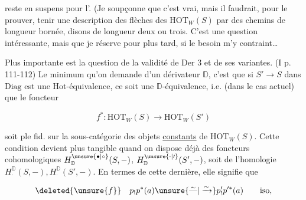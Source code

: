 
reste en suspens pour l'. (Je soupçonne que c'est vrai, mais il faudrait, pour le prouver, tenir une description des flèches des $\mathrm{HOT}_W(S)$ par des chemins de longueur bornée, disons  de longueur deux ou trois. C'est une question intéressante, mais que je réserve pour plus tard, si le besoin m'y contraint\ldots

Plus importante est la question de la validité de Der 3 et de ses variantes. (I p. 111-112) Le minimum qu'on demande d'un dérivateur $\mathbb D$, c'est que si $S'\longrightarrow S$ dans $\mathrm{Diag}$ est une Hot-équivalence, ce soit une $\mathbb D$-équivalence, i.e.  (dans le cas actuel) que le foncteur

\[
f^*:\mathrm{HOT}_W(S)\longrightarrow\mathrm{HOT}_W(S')
\]

soit ple fid. sur la sous-catégorie des objets \uline{constants} de $\mathrm{HOT}_W(S)$. Cette condition devient plus tangible quand on dispose déjà  des foncteurs cohomologiques $H^{\unsure{\bullet|\circ}}_{\mathbb D}(S,-)$, $H^{\unsure{\cdot|\prime}}_{\mathbb D}(S',-)$, soit de l'homologie $H^{\mathbb D}_{\cdot}(S,-),H^{\mathbb D}_{\cdot}(S',-)$. En termes de cette dernière, elle signifie que

\[
\deleted{\unsure{f}}\quad p_!p^*(a)\unsure{\overset{\sim}{\text{---}}|\xrightarrow{\sim}}p'_!p'^*(a)\qquad\text{iso},
\]

